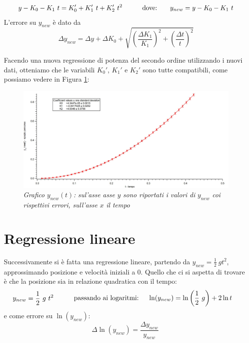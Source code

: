 \documentclass[12pt, a4paper]{article}
\begin{document}
\begin{equation*}
\begin{aligned}
  & & y - K_0 - K_1\ t = K_0'+K_1'\ t+K_{2}'\ t^2
  &\quad{} 
  \end{aligned}
  \begin{aligned}
  & &\text{dove:\phantom{.......}} y_{new} = y - K_0 - K_1\ t 
  &
  \end{aligned}
\end{equation*}
L'errore su  $y_{new}$ è dato da
\begin{equation*}
 \Delta y_{new} = \Delta y + \Delta K_0 + \sqrt{\left(\frac{\Delta K_1}{K_1}\right)^2 + \left(\frac{\Delta t}{t}\right)^2}
 \end{equation*}


Facendo una nuova regressione di potenza del secondo ordine utilizzando i nuovi dati, otteniamo che le variabili $K_0'$, $K_1'$ e $K_2'$ sono tutte compatibili, come possiamo vedere in Figura \ref{Grafico parabolico}:
\bigskip
\bigskip

    \begin{figure}[h!]
\centering
\includegraphics[width=170mm]{Immagini/Graph1.jpg}
\caption{\textit{{\footnotesize{Grafico $y_{new}(t)$: sul'asse asse $y$ sono riportati i valori di $y_{new}$ coi rispettivi errori, sull'asse $x$ il tempo}}}}
\label{Grafico parabolico}
\end{figure}




\newpage
\section{Regressione lineare}
Successivamente si è fatta una regressione lineare, partendo da $y_{new}= \frac{1}{2}\ g t^2$, approssimando posizione e velocità iniziali a $0$. Quello che ci si aspetta di trovare è che la posizione sia in relazione quadratica con il tempo:
\begin{equation*}
\begin{aligned}
  & y_{new}= \frac{1}{2}\ g\ t^2
  &\quad{} 
  \end{aligned}
  \begin{aligned}
  &&\text{passando ai logaritmi:\phantom{..}}& & \ln(y_{new})=\ln\left({\frac{1}{2}\ g}\right) +2\ln{t}
  &
  \end{aligned}
\end{equation*}
e come errore su $\ln({y_{new}})$: 
\begin{equation*}
    \Delta\ln{(y_{new})}=\frac{\Delta y_{new}}{y_{new}}\ 
\end{equation*}\\
\end{document}
